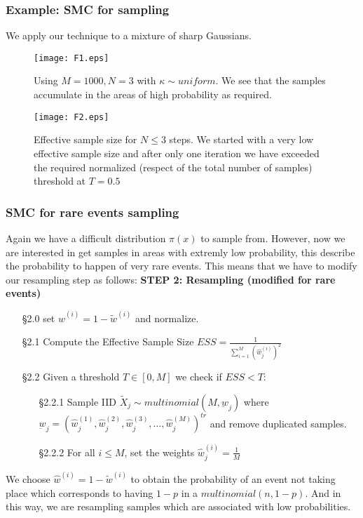 \documentclass[aspectratio=169]{beamer}\usepackage[utf8]{inputenc}
\begin{document}
\begin{frame}\frametitle{Example: SMC for sampling  }
We apply our technique to a mixture of sharp Gaussians.
\begin{figure}[h!]
	\centering
	\begin{minipage}{.45\textwidth}
		\centering
		\texttt{[image: F1.eps]}
		\caption{Using $M=1000, N=3$ with  $ \kappa \sim uniform $. We see that the samples accumulate in the areas of high probability as required.   }
		\label{Ex1}
	\end{minipage}%
	\begin{minipage}{.05\textwidth}
	\end{minipage}
	\begin{minipage}{.40\textwidth}
		\centering
		\texttt{[image: F2.eps]}
		\caption{Effective sample size for $N\leq 3$ steps. We started with a very low effective sample size and after only one iteration we have exceeded the required normalized (respect of the total number of samples) threshold at $T=0.5$}
		\label{Ex2}
	\end{minipage}
\end{figure}
\end{frame}

\begin{frame}\frametitle{SMC for rare events sampling }
Again we have  a difficult distribution $\pi (x)$ to sample from. However, now we are interested in get samples in areas with extremly low probability, this describe the probability to happen of very rare events. This means that we have to modify our resampling step as follows:
\textbf{STEP 2: Resampling (modified for rare events) }\\
\begin{enumerate}
\item[§2.0]  set $\hat{w}^{(i)}= 1-\tilde{w}^{(i)}$ and normalize.
\item[§2.1] Compute the Effective Sample Size $ESS= \frac{1}{\sum_{i=1}^M (\hat{w}^{(i)}_j )^2 }$ 
\item [§2.2] Given a threshold $T \in [0,M]$ we check if $ESS < T$: 
\begin{enumerate}
\item[§2.2.1]  Sample IID $\tilde{X}_j  \sim  multinomial(M,\underbar{w}_j)$  where $\underbar{w}_j=(\hat{w}^{(1)}_j , \hat{w}^{(2)}_j ,\hat{w}^{(3)}_j ,\ldots, \hat{w}^{(M)}_j )^{tr} $ and remove duplicated samples.
\item[§2.2.2]  For all $i \leq M$, set the weights $ \hat{w}_j^{(i)} = \frac{1}{M} $
\end{enumerate}
\end{enumerate}
We choose  $\hat{w}^{(i)}= 1-\tilde{w}^{(i)}$ to obtain the probability of an event not taking place which corresponds to having $1-p$ in a $multinomial(n,1-p)$. And in this way, we are resampling  samples which are associated with low probabilities.
\end{frame} 
\end{document}
